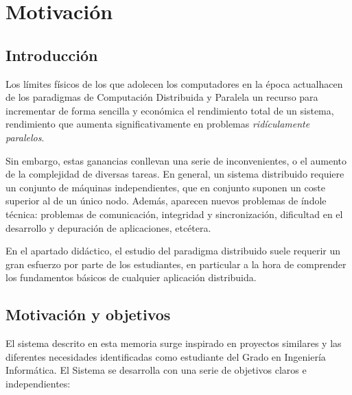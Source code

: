 \chapter{Motivación}

\section{Introducción}

Los límites físicos de los que adolecen los computadores en la época actual\citationneeded hacen de los paradigmas de Computación Distribuida y Paralela un recurso para incrementar de forma sencilla y económica el rendimiento total de un sistema, rendimiento que aumenta significativamente en problemas \textit{ridículamente paralelos}\citationneeded.

Sin embargo, estas ganancias conllevan una serie de inconvenientes, o el aumento de la complejidad de diversas tareas. En general, un sistema distribuido requiere un conjunto de máquinas independientes, que en conjunto suponen un coste superior al de un único nodo. Además, aparecen nuevos problemas de índole técnica: problemas de comunicación, integridad y sincronización, dificultad en el desarrollo y depuración de aplicaciones, etcétera.

En el apartado didáctico, el estudio del paradigma distribuido suele requerir un gran esfuerzo por parte de los estudiantes, en particular a la hora de comprender los fundamentos básicos de cualquier aplicación distribuida.

\section{Motivación y objetivos}

El sistema descrito en esta memoria surge inspirado en proyectos similares y las diferentes necesidades identificadas como estudiante del Grado en Ingeniería Informática. El Sistema se desarrolla con una serie de objetivos claros e independientes:

